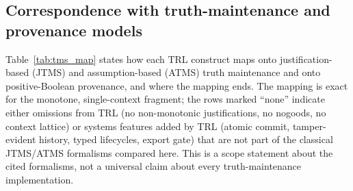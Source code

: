 \documentclass[journal]{IEEEtran}
\begin{document}
\subsection{Correspondence with truth-maintenance and provenance models}
Table~\ref{tab:tms_map} states how each TRL construct maps onto justification-based (JTMS) and assumption-based (ATMS) truth maintenance and onto positive-Boolean provenance, and where the mapping ends. The mapping is exact for the monotone, single-context fragment; the rows marked ``none'' indicate either omissions from TRL (no non-monotonic justifications, no nogoods, no context lattice) or systems features added by TRL (atomic commit, tamper-evident history, typed lifecycles, export gate) that are not part of the classical JTMS/ATMS formalisms compared here. This is a scope statement about the cited formalisms, not a universal claim about every truth-maintenance implementation.
\end{document}
